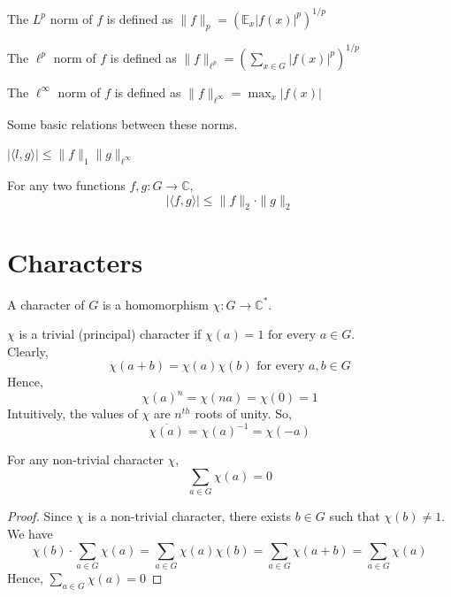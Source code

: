 \begin{definition}
The $L^p$ norm of $f$ is defined as $\| f \|_{p} = ({\mathbb{E}_x} |f(x)|^p)^{1/p} $
\end{definition}

\begin{definition}
The $\ell^p$ norm of $f$ is defined as $\| f \|_{\ell ^p} = (\sum\limits_{x \in G} |f(x)|^p)^{1/p} $
\end{definition}

\begin{definition}
The $\ell^\infty$ norm of $f$ is defined as $\| f \|_{\ell ^\infty} = \max_x |f(x)| $
\end{definition}

\noindent Some basic relations between these norms. 

\begin{prop}
$| \langle l,g \rangle | \leq \|f\|_1 \| g \|_{\ell^\infty}$
\end{prop}
\begin{prop}
For any two functions $f, g : G \rightarrow \mathbb{C}$,
$$| \langle f, g \rangle | \leq \|f \|_2 \cdot \| g \|_2$$
\end{prop}

\section{Characters}
\begin{definition} 
A character of $G$ is a homomorphism $\chi : G \rightarrow \mathbb{C}^*$.
\end{definition}
\noindent $\chi$ is a trivial (principal) character if $\chi(a) = 1 \text{ for every } a \in G$. \\
Clearly,
 $$\chi(a+b) = \chi(a) \chi(b) \text{ for every } a,b \in G $$
Hence,
$$\chi(a)^n = \chi(na) = \chi(0) = 1$$
Intuitively, the values of $\chi$ are $n^{th}$ roots of unity. So, 
$$\overline{\chi(a)} = \chi(a)^{-1} = \chi(-a)$$
\begin{prop}
For any non-trivial character $\chi$, 
$$\sum\limits_{a \in G} \chi(a) = 0$$
\end{prop}
\begin{proof}
Since $\chi$ is a non-trivial character, there exists $b \in G$ such that $\chi(b) \neq 1$. We have
$$\chi(b) \cdot \sum\limits_{a \in G} \chi(a)
= \sum\limits_{a \in G} \chi(a) \chi(b)
= \sum\limits_{a \in G} \chi(a + b)
= \sum\limits_{a \in G} \chi(a)$$
Hence, $\sum\limits_{a \in G} \chi(a) = 0$
\end{proof}

